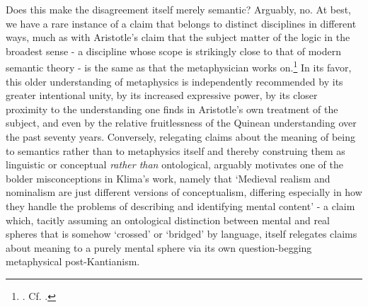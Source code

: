 \documentclass[]{article}
\begin{document}
Does this make the disagreement itself merely semantic? 
Arguably, no. 
At best, we have a rare instance of a claim that belongs to distinct disciplines in different ways, 
much as with Aristotle's claim that the subject matter of the logic in the broadest sense - 
a discipline whose scope is strikingly close to that of modern semantic theory - 
is the same as that the metaphysician works on.\footnote{\autocite[1004b 22-23]{Metaph}. Cf. \autocite[q. 3]{ScotusIsagoge}.}
In its favor, 
this older understanding of metaphysics is independently recommended 
by its greater intentional unity, 
by its increased expressive power, 
by its closer proximity to the understanding one finds in Aristotle's own treatment of the subject, 
and even by the relative fruitlessness of the Quinean understanding over the past seventy years.
Conversely, 
relegating claims about the meaning of being to semantics 
rather than to metaphysics itself 
and thereby construing them as linguistic or conceptual \emph{rather than} ontological, 
arguably motivates one of the bolder misconceptions in Klima's work, 
namely that 
`Medieval realism and nominalism are just different versions of conceptualism, differing especially in how they handle the problems of 
describing and identifying mental content' \autocite[110]{Klima2011} 
- a claim which, 
tacitly assuming an ontological distinction between mental and real spheres that is somehow `crossed' or `bridged' by language, 
itself relegates claims about meaning to a purely mental sphere via its own question-begging metaphysical post-Kantianism.

\printbibliography
\end{document}
